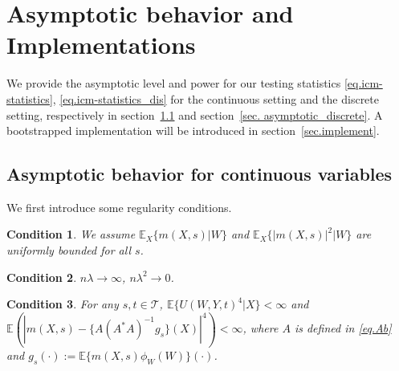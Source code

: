 \documentclass[
  12pt]{article}
\newtheorem{assumption}{Condition}
\def\cT{\mathcal{T}}
\begin{document}




\section{Asymptotic behavior and Implementations}\label{sec. asymptotic_implementations}

We provide the asymptotic level and power for our testing statistics \eqref{eq.icm-statistics}, \eqref{eq.icm-statistics_dis} for the continuous setting and the discrete setting, respectively in section~\ref{sec.asymptotic} and section~\ref{sec. asymptotic_discrete}. A bootstrapped implementation will be introduced in section~\ref{sec.implement}. 



\subsection{Asymptotic behavior for continuous variables}
\label{sec.asymptotic}
We first introduce some regularity conditions. 
\begin{assumption}\label{differentiabilty and integrability}
We assume $\mathbb{E}_X\{m(X,s)|W\}$ and $\mathbb{E}_X\{|m(X,s)| ^2|W\}$ are uniformly bounded for all $s$. 
\end{assumption}
\begin{assumption}\label{assum.bandwidth}
$n\lambda \rightarrow \infty$, $n\lambda^2\rightarrow 0$.
\end{assumption}
\begin{assumption}\label{assum.var}
    For any $s,t \in \cT$, $\mathbb{E}\{U(W,Y,t)^4|X\}<\infty$ and $\mathbb{E}(|m(X,s) -\{A(A^*A)^{-1}g_s\}(X)|^4)<\infty$, where $A$ is defined in \eqref{eq.Ab} and $g_s(\cdot):=\mathbb{E}\{ m(X,s) \phi_W(W)\}(\cdot)$.
\end{assumption}
\end{document}
